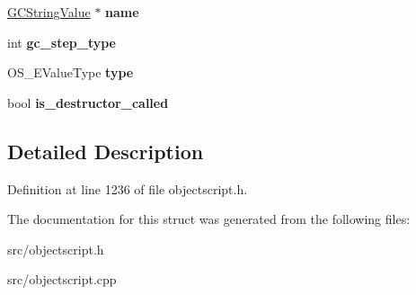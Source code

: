 \begin{DoxyCompactItemize}
\item 
\hyperlink{struct_object_script_1_1_o_s_1_1_core_1_1_g_c_string_value}{G\+C\+String\+Value} $\ast$ {\bfseries name}\hypertarget{struct_object_script_1_1_o_s_1_1_core_1_1_g_c_value_a0c2674a1fe72e9b97ade202a51a6af90}{}\label{struct_object_script_1_1_o_s_1_1_core_1_1_g_c_value_a0c2674a1fe72e9b97ade202a51a6af90}

\item 
int {\bfseries gc\+\_\+step\+\_\+type}\hypertarget{struct_object_script_1_1_o_s_1_1_core_1_1_g_c_value_ab4b39347419e9392f9eb2556046985a6}{}\label{struct_object_script_1_1_o_s_1_1_core_1_1_g_c_value_ab4b39347419e9392f9eb2556046985a6}

\item 
O\+S\+\_\+\+E\+Value\+Type {\bfseries type}\hypertarget{struct_object_script_1_1_o_s_1_1_core_1_1_g_c_value_aba57b34d0239476e36e86311e30ae0e3}{}\label{struct_object_script_1_1_o_s_1_1_core_1_1_g_c_value_aba57b34d0239476e36e86311e30ae0e3}

\item 
bool {\bfseries is\+\_\+destructor\+\_\+called}\hypertarget{struct_object_script_1_1_o_s_1_1_core_1_1_g_c_value_a3b2ce354d198db8ce4222212e06690de}{}\label{struct_object_script_1_1_o_s_1_1_core_1_1_g_c_value_a3b2ce354d198db8ce4222212e06690de}

\end{DoxyCompactItemize}


\subsection{Detailed Description}


Definition at line 1236 of file objectscript.\+h.



The documentation for this struct was generated from the following files\+:\begin{DoxyCompactItemize}
\item 
src/objectscript.\+h\item 
src/objectscript.\+cpp\end{DoxyCompactItemize}

